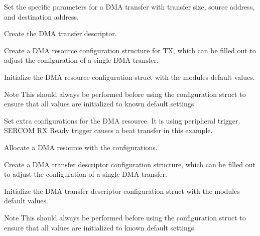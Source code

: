 \begin{DoxyEnumerate}
\item Set the specific parameters for a D\+MA transfer with transfer size, source address, and destination address. 
\begin{DoxyCodeInclude}{0}
\end{DoxyCodeInclude}

\item Create the D\+MA transfer descriptor. 
\begin{DoxyCodeInclude}{0}
\end{DoxyCodeInclude}

\item Create a D\+MA resource configuration structure for TX, which can be filled out to adjust the configuration of a single D\+MA transfer. 
\begin{DoxyCodeInclude}{0}
\end{DoxyCodeInclude}

\item Initialize the D\+MA resource configuration struct with the module\textquotesingle{}s default values. 
\begin{DoxyCodeInclude}{0}
\end{DoxyCodeInclude}
 \begin{DoxyNote}{Note}
This should always be performed before using the configuration struct to ensure that all values are initialized to known default settings.
\end{DoxyNote}

\item Set extra configurations for the D\+MA resource. It is using peripheral trigger. S\+E\+R\+C\+OM RX Ready trigger causes a beat transfer in this example. 
\begin{DoxyCodeInclude}{0}
\end{DoxyCodeInclude}

\item Allocate a D\+MA resource with the configurations. 
\begin{DoxyCodeInclude}{0}
\end{DoxyCodeInclude}

\item Create a D\+MA transfer descriptor configuration structure, which can be filled out to adjust the configuration of a single D\+MA transfer. 
\begin{DoxyCodeInclude}{0}
\end{DoxyCodeInclude}

\item Initialize the D\+MA transfer descriptor configuration struct with the module\textquotesingle{}s default values. 
\begin{DoxyCodeInclude}{0}
\end{DoxyCodeInclude}
 \begin{DoxyNote}{Note}
This should always be performed before using the configuration struct to ensure that all values are initialized to known default settings.
\end{DoxyNote}


\end{DoxyEnumerate}
